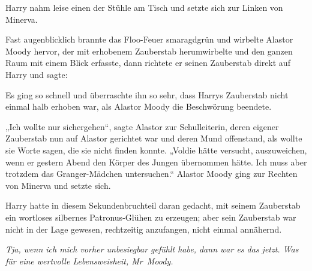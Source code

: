 Harry nahm leise einen der Stühle am Tisch und setzte sich zur Linken von Minerva.

Fast augenblicklich brannte das Floo-Feuer smaragdgrün und wirbelte Alastor Moody hervor, der mit erhobenem Zauberstab herumwirbelte und den ganzen Raum mit einem Blick erfasste, dann richtete er seinen Zauberstab direkt auf Harry und sagte: 

Es ging so schnell und überraschte ihn so sehr, dass Harrys Zauberstab nicht einmal halb erhoben war, als Alastor Moody die Beschwörung beendete.

„Ich wollte nur sichergehen“, sagte Alastor zur Schulleiterin, deren eigener Zauberstab nun auf Alastor gerichtet war und deren Mund offenstand, als wollte sie Worte sagen, die sie nicht finden konnte.
„Voldie hätte versucht, auszuweichen, wenn er gestern Abend den Körper des Jungen übernommen hätte. Ich muss aber trotzdem das Granger-Mädchen untersuchen.“
Alastor Moody ging zur Rechten von Minerva und setzte sich.

Harry hatte in diesem Sekundenbruchteil daran gedacht, mit seinem Zauberstab ein wortloses silbernes Patronus-Glühen zu erzeugen; aber sein Zauberstab war nicht in der Lage gewesen, rechtzeitig anzufangen, nicht einmal annähernd.

\emph{Tja, wenn ich mich vorher unbesiegbar gefühlt habe, dann war es das jetzt. Was für eine wertvolle Lebensweisheit, Mr~Moody.}

